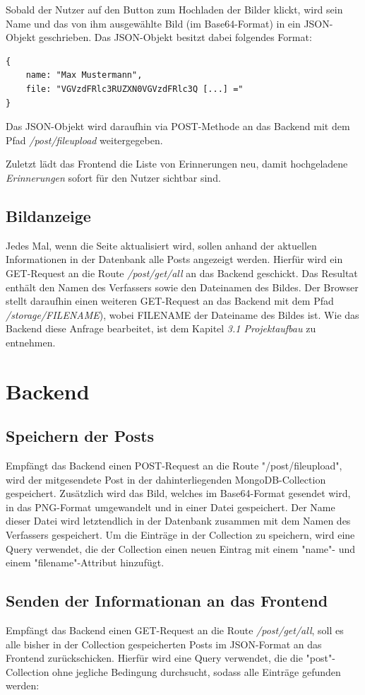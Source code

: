 \documentclass[12pt,a4paper]{report}
\begin{document}
Sobald der Nutzer auf den Button zum Hochladen der Bilder klickt, wird sein Name und das von ihm ausgewählte Bild (im Base64-Format) in ein JSON-Objekt geschrieben. Das JSON-Objekt besitzt dabei folgendes Format:
\begin{verbatim}
{
    name: "Max Mustermann",
    file: "VGVzdFRlc3RUZXN0VGVzdFRlc3Q [...] ="
}
\end{verbatim}

Das JSON-Objekt wird daraufhin via POST-Methode an das Backend mit dem Pfad \textit{/post/fileupload} weitergegeben.

Zuletzt lädt das Frontend die Liste von Erinnerungen neu, damit hochgeladene \textit{Erinnerungen} sofort für den Nutzer sichtbar sind.

\subsection{Bildanzeige}
Jedes Mal, wenn die Seite aktualisiert wird, sollen anhand der aktuellen Informationen in der Datenbank alle Posts angezeigt werden. Hierfür wird ein GET-Request an die Route \textit{/post/get/all} an das Backend geschickt. Das Resultat enthält den Namen des Verfassers sowie den Dateinamen des Bildes. Der Browser stellt daraufhin einen weiteren GET-Request an das Backend mit dem Pfad \textit{/storage/FILENAME}), wobei FILENAME der Dateiname des Bildes ist. Wie das Backend diese Anfrage bearbeitet, ist dem Kapitel \textit{3.1 Projektaufbau} zu entnehmen.

\section{Backend}

\subsection{Speichern der Posts}
Empfängt das Backend einen POST-Request an die Route "/post/fileupload", wird der mitgesendete Post in der dahinterliegenden MongoDB-Collection gespeichert. Zusätzlich wird das Bild, welches im Base64-Format gesendet wird, in das PNG-Format umgewandelt und in einer Datei gespeichert. Der Name dieser Datei wird letztendlich in der Datenbank zusammen mit dem Namen des Verfassers gespeichert.
Um die Einträge in der Collection zu speichern, wird eine Query verwendet, die der Collection einen neuen Eintrag mit einem "name"- und einem "filename"-Attribut hinzufügt.

\subsection{Senden der Informationan an das Frontend}
Empfängt das Backend einen GET-Request an die Route \textit{/post/get/all}, soll es alle bisher in der Collection gespeicherten Posts im JSON-Format an das Frontend zurückschicken. Hierfür wird eine Query verwendet, die die "post"-Collection ohne jegliche Bedingung durchsucht, sodass alle Einträge gefunden werden:
\end{document}
